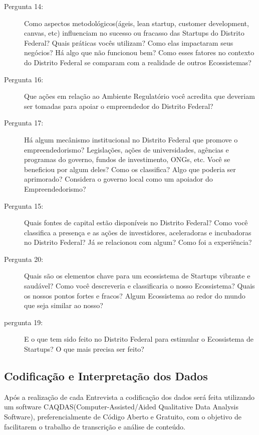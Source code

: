 \begin{description}
  \item [Pergunta 14:] Como aspectos metodológicos(ágeis, lean startup, customer development, canvas, etc) influenciam no sucesso ou fracasso das Startups do Distrito Federal? Quais práticas vocês utilizam? Como elas impactaram seus negócios? Há algo que não funcionou bem? Como esses fatores no contexto do Distrito Federal se comparam com a realidade de outros Ecossistemas?


  \item [Pergunta 16:] Que ações em relação ao Ambiente Regulatório você acredita que deveriam ser tomadas para apoiar o empreendedor do Distrito Federal?

  \item [Pergunta 17:] Há algum mecânismo institucional no Distrito Federal que promove o empreendedorismo? Legislações, ações de universidades, agências e programas do governo, fundos de investimento, ONGs, etc. Você se beneficiou por algum deles? Como os classifica? Algo que poderia ser aprimorado? Considera o governo local como um apoiador do Empreendedorismo?

  \item [Pergunta 15:] Quais fontes de capital estão disponíveis no Distrito Federal? Como você classifica a presença e as ações de investidores, aceleradoras e incubadoras no Distrito Federal? Já se relacionou com algum? Como foi a experiência?

  
  \item [Pergunta 20:] Quais são os elementos chave para um ecossistema de Startups vibrante e saudável? Como você descreveria e classificaria o nosso Ecossistema? Quais os nossos pontos fortes e fracos? Algum Ecossistema ao redor do mundo que seja similar ao nosso?

  \item [pergunta 19:] E o que tem sido feito no Distrito Federal para estimular o Ecossistema de Startups? O que mais precisa ser feito?
\end{description}

\subsection{Codificação e Interpretação dos Dados}
\label{subsection:codificacao_e_interpretacao_dos_dados}

Após a realização de cada Entrevista a codificação dos dados será feita utilizando um software CAQDAS(Computer-Assisted/Aided Qualitative Data Analysis Software), preferencialmente de Código Aberto e Gratuito, com o objetivo de facilitarem o trabalho de transcrição e análise de conteúdo. 


